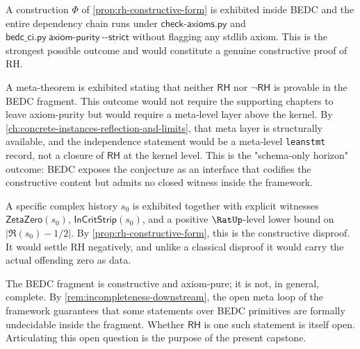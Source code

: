 \begin{remark}
\label{rem:rh-outcome-provable}
A construction $\Phi$ of \autoref{prop:rh-constructive-form} is exhibited inside BEDC and the entire dependency chain runs under $\mathsf{check\text{-}axioms.py}$ and $\mathsf{bedc\_ci.py\ axiom\text{-}purity\ \text{-}\text{-}strict}$ without flagging any stdlib axiom. This is the strongest possible outcome and would constitute a genuine constructive proof of RH.
\end{remark}

\begin{remark}
\label{rem:rh-outcome-independence}
A meta-theorem is exhibited stating that neither $\mathsf{RH}$ nor $\neg\mathsf{RH}$ is provable in the BEDC fragment. This outcome would not require the supporting chapters to leave axiom-purity but would require a meta-level layer above the kernel. By \autoref{ch:concrete-instances-reflection-and-limits}, that meta layer is structurally available, and the independence statement would be a meta-level \texttt{leanstmt} record, not a closure of $\mathsf{RH}$ at the kernel level. This is the "schema-only horizon" outcome: BEDC exposes the conjecture as an interface that codifies the constructive content but admits no closed witness inside the framework.
\end{remark}

\begin{remark}
\label{rem:rh-outcome-counterexample}
A specific complex history $s_0$ is exhibited together with explicit witnesses $\mathsf{ZetaZero}(s_0)$, $\mathsf{InCritStrip}(s_0)$, and a positive $\RatUp$-level lower bound on $|\Re(s_0) - 1/2|$. By \autoref{prop:rh-constructive-form}, this is the constructive disproof. It would settle RH negatively, and unlike a classical disproof it would carry the actual offending zero as data.
\end{remark}

\begin{remark}
\label{rem:rh-fragment-undecided}
The BEDC fragment is constructive and axiom-pure; it is not, in general, complete. By \autoref{rem:incompleteness-downstream}, the open meta loop of the framework guarantees that some statements over BEDC primitives are formally undecidable inside the fragment. Whether $\mathsf{RH}$ is one such statement is itself open. Articulating this open question is the purpose of the present capstone.
\end{remark}

